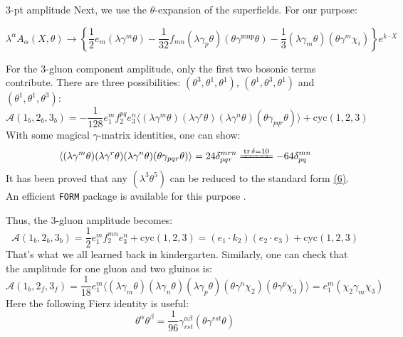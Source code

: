 \documentclass{beamer}
\begin{document}
\begin{frame}[allowframebreaks]{3-pt amplitude}
	Next, we use the $\theta$-expansion of the superfields. For our purpose:
\begin{footnotesize}
		\begin{equation*}
		\lambda^\alpha A_\alpha(X,\theta)\to\left\{\frac{1}{2}e_m(\lambda\gamma^m\theta)-\frac{1}{32}f_{mn}(\lambda\gamma_p\theta)(\theta\gamma^\mathrm{mnр}\theta)-\frac{1}{3}(\lambda\gamma_m\theta)(\theta\gamma^m\chi_i)\right\}e^{k\cdot X}
	\end{equation*}
\end{footnotesize}
	For the 3-gluon component amplitude, only the first two bosonic terms contribute. There are three possibilities: $(\theta^3,\theta^1,\theta^1)$, $(\theta^1,\theta^3,\theta^1)$ and $(\theta^1,\theta^1,\theta^3)$:
	\begin{equation*}
		\mathcal{A}(1_b,2_b,3_b)=-\frac{1}{128}e_1^mf_2^{pq}e_3^n\langle(\lambda\gamma^m\theta)(\lambda\gamma^r\theta)(\lambda\gamma^n\theta)(\theta\gamma_{pqr}\theta)\rangle+\mathrm{cyc}(1,2,3)
	\end{equation*}
	With some magical $\gamma$-matrix identities, one can show:
	\begin{equation*}
		\langle(\lambda\gamma^m\theta)(\lambda\gamma^r\theta)(\lambda\gamma^n\theta)(\theta\gamma_{pqr}\theta)\rangle=24\delta_{pqr}^{mrn}\xlongequal{\tr\delta = 10}-64\delta_{pq}^{mn}
	\end{equation*}
	It has been proved that any $(\lambda^3\theta^5)$ can be reduced to the standard form \hyperlink{l3t5}{\color{blue}(6)}. An efficient \texttt{FORM} package is available for this purpose \cite{Mafra:2010pn}.
	
	Thus, the 3-gluon amplitude becomes:
	\begin{equation*}
		\mathcal{A}(1_b,2_b,3_b)=\frac{1}{2}e_1^mf_2^{mn}e_3^n+\mathrm{cyc}(1,2,3)=(e_1\cdot k_2)(e_2\cdot e_3)+\mathrm{cyc}(1,2,3)
	\end{equation*}
	That's what we all learned back in kindergarten. Similarly, one can check that the amplitude for one gluon and two gluinos is:
	\begin{equation*}
		\mathcal{A}(1_b,2_f,3_f)=\frac{1}{18}e_1^m\langle(\lambda\gamma_m\theta)(\lambda\gamma_n\theta)(\lambda\gamma_p\theta)(\theta\gamma^n\chi_2)(\theta\gamma^p\chi_3)\rangle=e_1^m(\chi_2\gamma_m\chi_3)
	\end{equation*}
	Here the following Fierz identity is useful:
	\begin{equation*}
		\theta^\alpha\theta^\beta=\frac{1}{96}\gamma_{rst}^{\alpha\beta}(\theta\gamma^{rst}\theta)
	\end{equation*}
\end{frame}
\end{document}
